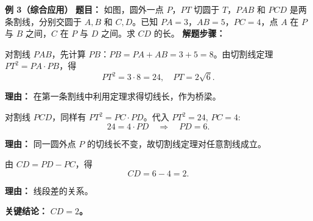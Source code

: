\begin{examplebox}
	\medskip
	\textbf{\textcolor{CExample}{例 3（综合应用）}}
	\textbf{\textcolor{CExample}{题目：}}
	如图，圆外一点 $P$，$PT$ 切圆于 $T$，$PAB$ 和 $PCD$ 是两条割线，分别交圆于 $A,B$ 和 $C,D$。已知 $PA=3$，$AB=5$，$PC=4$，点 $A$ 在 $P$ 与 $B$ 之间，$C$ 在 $P$ 与 $D$ 之间。求 $CD$ 的长。
	\textbf{\textcolor{CExample}{解题步骤：}}
	\begin{description}[style=nextline, leftmargin=2.8em, labelsep=0.5em, itemsep=0.45em]
		\item[\textbf{第一步（求切线长）：}]
			对割线 $PAB$，先计算 $PB$：$PB=PA+AB=3+5=8$。由切割线定理 $PT^{2}=PA\cdot PB$，得
			\[
				PT^{2}=3\cdot 8=24,\quad PT=2\sqrt{6}.
			\]
			\par\textbf{理由：} 在第一条割线中利用定理求得切线长，作为桥梁。
		\item[\textbf{第二步（对另一割线列式）：}]
			对割线 $PCD$，同样有 $PT^{2}=PC\cdot PD$。代入 $PT^{2}=24$, $PC=4$:
			\[
				24 = 4\cdot PD \quad\Rightarrow\quad PD=6.
			\]
			\par\textbf{理由：} 同一圆外点 $P$ 的切线长不变，故切割线定理对任意割线成立。
		\item[\textbf{第三步（求 $CD$）：}]
			由 $CD=PD-PC$，得
			\[
				CD = 6 - 4 = 2.
			\]
			\par\textbf{理由：} 线段差的关系。
	\end{description}
	\textbf{\textcolor{CExample}{关键结论：}}
	\textbf{$CD=2$。}
\end{examplebox}
